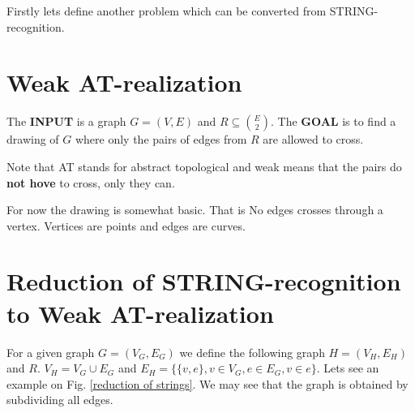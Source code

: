 Firstly lets define another problem which can be converted from STRING-recognition.

\section{Weak AT-realization}

The \textbf{INPUT} is a graph $G = (V,E)$ and $R \subseteq \binom{E}{2}$. The \textbf{GOAL} is to find a drawing of $G$ where only the pairs of edges from $R$ are allowed to cross.

Note that AT stands for abstract topological and weak means that the pairs do \textbf{not hove} to cross, only they can.

For now the drawing is somewhat basic. That is No edges crosses through a vertex. Vertices are points and edges are curves.

\section{Reduction of STRING-recognition to Weak AT-realization}

For a given graph $G = (V_G,E_G)$ we define the following graph $H = (V_H, E_H)$ and $R$. $V_H = V_G \cup E_G$ and $E_H = \{\{v,e\}, v \in V_G, e \in E_G, v \in e\}$. Lets see an example on Fig. \ref{reduction of strings}. We may see that the graph is obtained by subdividing all edges.

